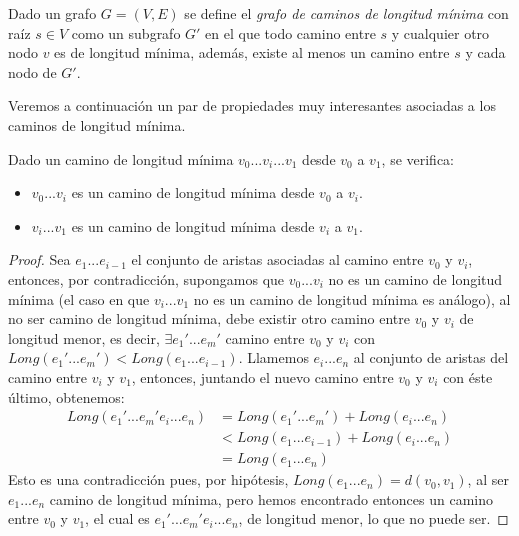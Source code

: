 \begin{definicion}
	Dado un grafo $G=(V,E)$ se define el \textit{grafo de caminos de longitud mínima} con raíz $s\in V$ como un subgrafo $G'$ en el que todo camino entre $s$ y cualquier otro nodo $v$ es de longitud mínima, además, existe al menos un camino entre $s$ y cada nodo de $G'$.
\end{definicion}

Veremos a continuación un par de propiedades muy interesantes asociadas a los caminos de longitud mínima.

\begin{proposicion}\label{prop:separa_cam_min_long}
	Dado un camino de longitud mínima $v_0...v_i...v_1$ desde $v_0$ a $v_1$, se verifica:
	\begin{itemize}
		\item $v_0...v_i$ es un camino de longitud mínima desde $v_0$ a $v_i$.
		\item $v_i...v_1$ es un camino de longitud mínima desde $v_i$ a $v_1$.
	\end{itemize}
\end{proposicion}

\begin{proof}
	Sea $e_1...e_{i-1}$ el conjunto de aristas asociadas al camino entre $v_0$ y $v_i$, entonces, por contradicción, supongamos que $v_0...v_i$ no es un camino de longitud mínima (el caso en que $v_i...v_1$ no es un camino de longitud mínima es análogo), al no ser camino de longitud mínima, debe existir otro camino entre $v_0$ y $v_i$ de longitud menor, es decir, $\exists e_1'...e_m'$ camino entre $v_0$ y $v_i$ con $Long(e_1'...e_m') < Long(e_1...e_{i-1})$. Llamemos $e_i...e_n$ al conjunto de aristas del camino entre $v_i$ y $v_1$, entonces, juntando el nuevo camino entre $v_0$ y $v_i$ con éste último, obtenemos:
	\begin{equation}
		\begin{split}
			Long(e_1'...e_m'e_i...e_n) & =Long(e_1'...e_m') + Long(e_i...e_n) \\
			& < Long(e_1...e_{i-1}) + Long(e_i...e_n) \\
			& =	Long(e_1...e_n)
		\end{split}
	\end{equation}
	Esto es una contradicción pues, por hipótesis, $Long(e_1...e_n) = d(v_0,v_1)$, al ser $e_1...e_n$ camino de longitud mínima, pero hemos encontrado entonces un camino entre $v_0$ y $v_1$, el cual es $e_1'...e_m'e_i...e_n$, de longitud menor, lo que no puede ser.
\end{proof}

